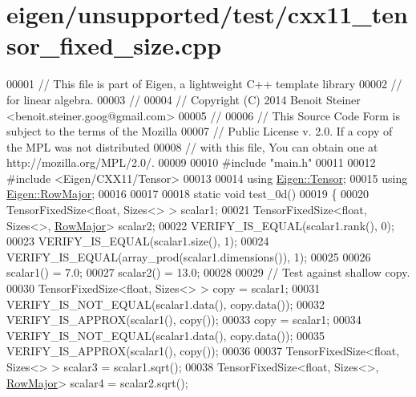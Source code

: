 \hypertarget{eigen_2unsupported_2test_2cxx11__tensor__fixed__size_8cpp_source}{}\section{eigen/unsupported/test/cxx11\+\_\+tensor\+\_\+fixed\+\_\+size.cpp}
\label{eigen_2unsupported_2test_2cxx11__tensor__fixed__size_8cpp_source}

\begin{DoxyCode}
00001 \textcolor{comment}{// This file is part of Eigen, a lightweight C++ template library}
00002 \textcolor{comment}{// for linear algebra.}
00003 \textcolor{comment}{//}
00004 \textcolor{comment}{// Copyright (C) 2014 Benoit Steiner <benoit.steiner.goog@gmail.com>}
00005 \textcolor{comment}{//}
00006 \textcolor{comment}{// This Source Code Form is subject to the terms of the Mozilla}
00007 \textcolor{comment}{// Public License v. 2.0. If a copy of the MPL was not distributed}
00008 \textcolor{comment}{// with this file, You can obtain one at http://mozilla.org/MPL/2.0/.}
00009 
00010 \textcolor{preprocessor}{#include "main.h"}
00011 
00012 \textcolor{preprocessor}{#include <Eigen/CXX11/Tensor>}
00013 
00014 \textcolor{keyword}{using} \hyperlink{class_eigen_1_1_tensor}{Eigen::Tensor};
00015 \textcolor{keyword}{using} \hyperlink{group__enums_ggaacded1a18ae58b0f554751f6cdf9eb13acfcde9cd8677c5f7caf6bd603666aae3}{Eigen::RowMajor};
00016 
00017 
00018 \textcolor{keyword}{static} \textcolor{keywordtype}{void} test\_0d()
00019 \{
00020   TensorFixedSize<float, Sizes<> > scalar1;
00021   TensorFixedSize<float, Sizes<>, \hyperlink{group__enums_ggaacded1a18ae58b0f554751f6cdf9eb13acfcde9cd8677c5f7caf6bd603666aae3}{RowMajor}> scalar2;
00022   VERIFY\_IS\_EQUAL(scalar1.rank(), 0);
00023   VERIFY\_IS\_EQUAL(scalar1.size(), 1);
00024   VERIFY\_IS\_EQUAL(array\_prod(scalar1.dimensions()), 1);
00025 
00026   scalar1() = 7.0;
00027   scalar2() = 13.0;
00028 
00029   \textcolor{comment}{// Test against shallow copy.}
00030   TensorFixedSize<float, Sizes<> > copy = scalar1;
00031   VERIFY\_IS\_NOT\_EQUAL(scalar1.data(), copy.data());
00032   VERIFY\_IS\_APPROX(scalar1(), copy());
00033   copy = scalar1;
00034   VERIFY\_IS\_NOT\_EQUAL(scalar1.data(), copy.data());
00035   VERIFY\_IS\_APPROX(scalar1(), copy());
00036 
00037   TensorFixedSize<float, Sizes<> > scalar3 = scalar1.sqrt();
00038   TensorFixedSize<float, Sizes<>, \hyperlink{group__enums_ggaacded1a18ae58b0f554751f6cdf9eb13acfcde9cd8677c5f7caf6bd603666aae3}{RowMajor}> scalar4 = scalar2.sqrt();

\end{DoxyCode}
